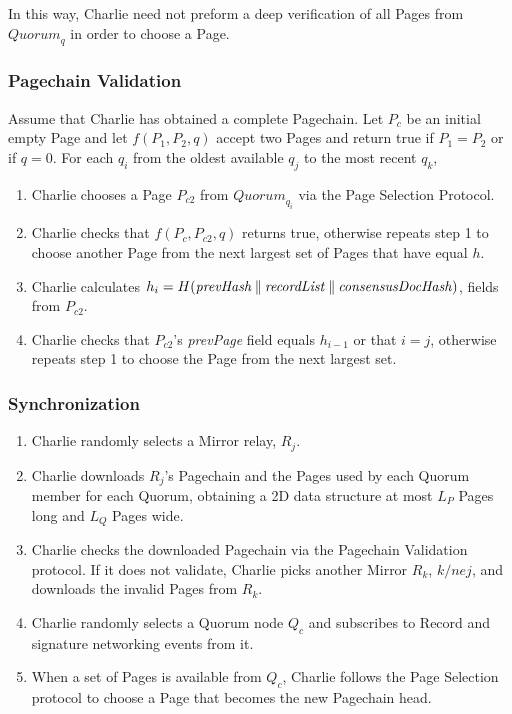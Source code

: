 In this way, Charlie need not preform a deep verification of all Pages from $ \mathit{Quorum}_{q} $ in order to choose a Page.

\subsubsection{Pagechain Validation}

Assume that Charlie has obtained a complete Pagechain. Let $ P_{c} $ be an initial empty Page and let $ f(P_{1}, P_{2}, q) $ accept two Pages and return true if $ P_{1} = P_{2} $ or if $ q = 0 $. For each $ q_{i} $ from the oldest available $ q_{j} $ to the most recent $ q_{k} $,

\begin{enumerate}
	\item Charlie chooses a Page $ P_{c2} $ from $ \mathit{Quorum}_{q_{i}} $ via the Page Selection Protocol.
	\item Charlie checks that $ f(P_{c}, P_{c2}, q) $ returns true, otherwise repeats step 1 to choose another Page from the next largest set of Pages that have equal $ h $.
	\item Charlie calculates $ h_{i} = H(\mathit{prevHash} \mathbin{\|} \mathit{recordList} \mathbin{\|} \mathit{consensusDocHash}) $, fields from $ P_{c2} $.
	\item Charlie checks that $ P_{c2} $'s \emph{prevPage} field equals $ h_{i-1} $ or that $ i = j $, otherwise repeats step 1 to choose the Page from the next largest set.
\end{enumerate}

\subsubsection{Synchronization}
\label{sec:Synchronization}

\begin{enumerate}
	\item Charlie randomly selects a Mirror relay, $ R_{j} $.
	\item Charlie downloads $ R_{j} $'s Pagechain and the Pages used by each Quorum member for each Quorum, obtaining a 2D data structure at most $ L_{P} $ Pages long and $ L_{Q} $ Pages wide.
	\item Charlie checks the downloaded Pagechain via the Pagechain Validation protocol. If it does not validate, Charlie picks another Mirror $ R_{k} $, $ k /ne j $, and downloads the invalid Pages from $ R_{k} $.
	\item Charlie randomly selects a Quorum node $ Q_{c} $ and subscribes to Record and signature networking events from it.
	\item When a set of Pages is available from $ Q_{c} $, Charlie follows the Page Selection protocol to choose a Page that becomes the new Pagechain head.
\end{enumerate}

